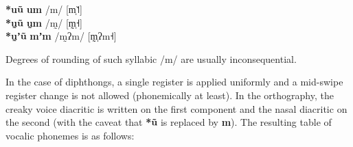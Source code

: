 \documentclass[11pt,a5paper]{book}
\newcommand{\qcn}[1]{\textcolor{AccentText}{\large\textbf{#1}}}
\begin{document}
\begin{center}
	\qcn{*uũ} \textrightarrow \qcn{um} \textrightarrow /m/ [m̩˥˦] \\
	\qcn{*ṵũ} \textrightarrow \qcn{ṵm} \textrightarrow /m̰/ [m̩̰˧]\\
	\qcn{*ṵʼũ} \textrightarrow \qcn{mʼm} \textrightarrow /m̰ʔm/ [m̩̰ʔm˧]\\
\end{center}

Degrees of rounding of such syllabic /m/ are usually inconsequential.

 In the case of diphthongs, a single register is applied uniformly and a mid-swipe register change is not allowed (phonemically at least). In the orthography, the creaky voice diacritic is written on the first component and the nasal diacritic on the second (with the caveat that \qcn{*ũ} is replaced by \qcn{m}). The resulting table of vocalic phonemes is as follows:
%
\end{document}
